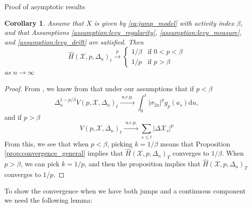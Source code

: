 \documentclass[fleqn,11pt,letterpaper]{article}
\theoremstyle{plain}
\newtheorem{corollary}{Corollary}[section]
\theoremstyle{definition}
\theoremstyle{remark}
\numberwithin{equation}{section}
\begin{document}
\begin{section}{Proof of asymptotic results}
\begin{corollary}
    Assume that $X$ is given by \eqref{eq:jump_model} with activity index $\beta$, and that Assumptions \ref{assumption:levy_regularity}, \ref{assumption:levy_measure}, and \ref{assumption:levy_drift} are satisfied. Then
    \begin{equation}
        \hat{H}(\mathcal{X},p,\Delta_n)_t\overset{p}{\to}\begin{cases}
    1/\beta & \text{if }0<p<\beta\\
    1/p & \text{if }p>\beta
    \end{cases}
    \end{equation}
    as $n\to\infty$    
\end{corollary}

\begin{proof}
    From \cite{Todorov2010}, we know from that under our assumptions that if $p<\beta$
    \begin{equation}
        \Delta_n^{1-p / \beta} V\left(p, \mathcal{X}, \Delta_n\right)_t \stackrel{\text { u.c.p. }}{\longrightarrow} \int_0^t\left|\sigma_{2 u}\right|^p g_p\left(a_s\right) \mathrm{d} u,
    \end{equation}
    and if $p>\beta$
    \begin{equation}
        V\left(p, \mathcal{X}, \Delta_n\right)_t \stackrel{\text { u.c.p. }}{\longrightarrow} \sum_{s \leq t}\left|\Delta \mathcal{X}_s\right|^p
    \end{equation}
    From this, we see that when $p<\beta$, picking $k=1/\beta$ means that Proposition \ref{prop:convergence_general} implies that $\hat{H}(\mathcal{X},p,\Delta_n)_T$ converges to $1/\beta$. When $p>\beta$, we can pick $k=1/p$, and then the proposition implies that $\hat{H}(\mathcal{X},p,\Delta_n)_T$ converges to $1/p$.
\end{proof}

To show the convergence when we have both jumps and a continuous component we need the following lemma: 


\end{section}
\end{document}

